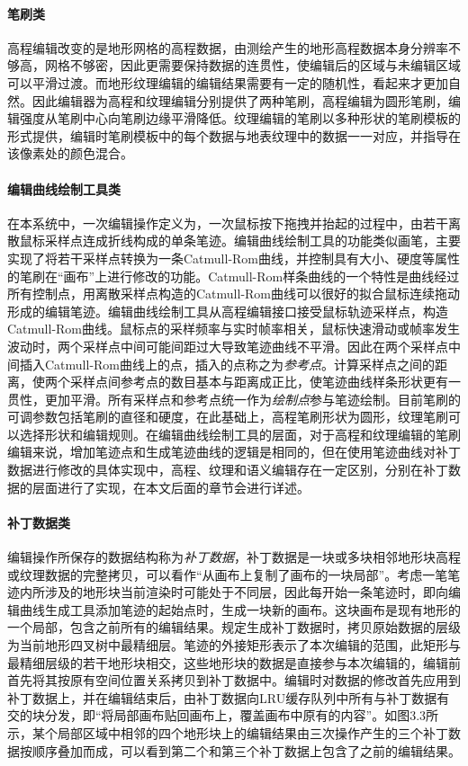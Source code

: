 \paragraph{笔刷类}
高程编辑改变的是地形网格的高程数据，由测绘产生的地形高程数据本身分辨率不够高，网格不够密，因此更需要保持数据的连贯性，使编辑后的区域与未编辑区域可以平滑过渡。而地形纹理编辑的编辑结果需要有一定的随机性，看起来才更加自然。因此编辑器为高程和纹理编辑分别提供了两种笔刷，高程编辑为圆形笔刷，编辑强度从笔刷中心向笔刷边缘平滑降低。纹理编辑的笔刷以多种形状的笔刷模板的形式提供，编辑时笔刷模板中的每个数据与地表纹理中的数据一一对应，并指导在该像素处的颜色混合。
\paragraph{编辑曲线绘制工具类}
在本系统中，一次编辑操作定义为，一次鼠标按下拖拽并抬起的过程中，由若干离散鼠标采样点连成折线构成的单条笔迹。编辑曲线绘制工具的功能类似画笔，主要实现了将若干采样点转换为一条Catmull-Rom曲线，并控制具有大小、硬度等属性的笔刷在“画布”上进行修改的功能。Catmull-Rom样条曲线的一个特性是曲线经过所有控制点\supercite{catmull-rom}，用离散采样点构造的Catmull-Rom曲线可以很好的拟合鼠标连续拖动形成的编辑笔迹。编辑曲线绘制工具从高程编辑接口接受鼠标轨迹采样点，构造Catmull-Rom曲线。鼠标点的采样频率与实时帧率相关，鼠标快速滑动或帧率发生波动时，两个采样点中间可能间距过大导致笔迹曲线不平滑。因此在两个采样点中间插入Catmull-Rom曲线上的点，插入的点称之为\textit{参考点}。计算采样点之间的距离，使两个采样点间参考点的数目基本与距离成正比，使笔迹曲线样条形状更有一贯性，更加平滑。所有采样点和参考点统一作为\textit{绘制点}参与笔迹绘制。目前笔刷的可调参数包括笔刷的直径和硬度，在此基础上，高程笔刷形状为圆形，纹理笔刷可以选择形状和编辑规则。在编辑曲线绘制工具的层面，对于高程和纹理编辑的笔刷编辑来说，增加笔迹点和生成笔迹曲线的逻辑是相同的，但在使用笔迹曲线对补丁数据进行修改的具体实现中，高程、纹理和语义编辑存在一定区别，分别在补丁数据的层面进行了实现，在本文后面的章节会进行详述。\par
\paragraph{补丁数据类}
编辑操作所保存的数据结构称为\textit{补丁数据}，补丁数据是一块或多块相邻地形块高程或纹理数据的完整拷贝，可以看作“从画布上复制了画布的一块局部”。考虑一笔笔迹内所涉及的地形块当前渲染时可能处于不同层，因此每开始一条笔迹时，即向编辑曲线生成工具添加笔迹的起始点时，生成一块新的画布。这块画布是现有地形的一个局部，包含之前所有的编辑结果。规定生成补丁数据时，拷贝原始数据的层级为当前地形四叉树中最精细层。笔迹的外接矩形表示了本次编辑的范围，此矩形与最精细层级的若干地形块相交，这些地形块的数据是直接参与本次编辑的，编辑前首先将其按原有空间位置关系拷贝到补丁数据中。编辑时对数据的修改首先应用到补丁数据上，并在编辑结束后，由补丁数据向LRU缓存队列中所有与补丁数据有交的块分发，即“将局部画布贴回画布上，覆盖画布中原有的内容”。如图3.3所示，某个局部区域中相邻的四个地形块上的编辑结果由三次操作产生的三个补丁数据按顺序叠加而成，可以看到第二个和第三个补丁数据上包含了之前的编辑结果。\par

